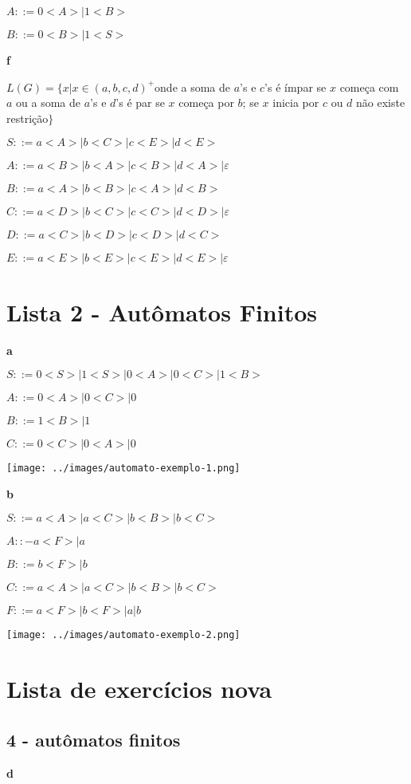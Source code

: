 \documentclass[ ]{article}
\begin{document}
	$A::= 0<A> | 1<B>$ %
	
	$B::= 0<B> | 1<S> $ %
	
	\textbf{f}
	
	$L(G) = \{ x | x \in (a,b,c,d)^+$onde a soma de $a$'s e $c$'s é ímpar se $x$ começa com $a$ ou a soma de $a$'s e $d$'s é par se $x$ começa por $b$; se $x$ inicia por $c$ ou $d$ não existe restrição$\}$
	
	$S::= a<A> | b<C> | c<E> | d<E> $ %
	
	$A::= a<B> | b<A> | c<B> | d<A> | \varepsilon$ %
	
	$B::= a<A> | b<B> | c<A> | d<B>$ %
	
	$C::= a<D> | b<C> | c<C> | d<D> | \varepsilon$ %

	$D::= a<C> | b<D> | c<D> | d<C>$ %
	
	$E::= a<E> | b<E> | c<E> | d<E> | \varepsilon$
	\section*{Lista 2 - Autômatos Finitos}
		\textbf{a}
		
		$S::= 0<S> | 1<S> | 0<A> | 0<C> | 1<B>$
		
		$A::= 0<A> | 0<C> | 0$
		
		$B::= 1<B> | 1$
		
		$C::= 0<C> | 0<A> | 0$
		
		\texttt{[image: ../images/automato-exemplo-1.png]}
		
		\textbf{b}
		
		$S::= a<A> | a<C> | b<B> | b<C>$
		
		$A::- a<F> | a$
		
		$B::= b<F> | b$
		
		$C::= a<A> | a<C> | b<B> | b<C>$
		
		$F::= a<F> | b<F> | a | b$
		
		\texttt{[image: ../images/automato-exemplo-2.png]}
		
	\section*{Lista de exercícios nova}
		\subsection{4 - autômatos finitos}
		\textbf{d} %
		
\end{document}
